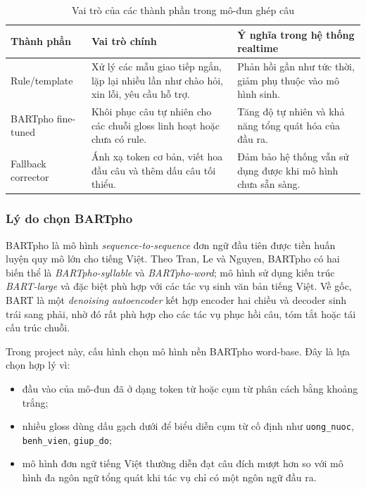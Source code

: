 \begin{table}[H]
\centering
\caption{Vai trò của các thành phần trong mô-đun ghép câu}
\begin{tabularx}{\textwidth}{|p{3.2cm}|X|X|}
\hline
\textbf{Thành phần} & \textbf{Vai trò chính} & \textbf{Ý nghĩa trong hệ thống realtime} \\
\hline
Rule/template & Xử lý các mẫu giao tiếp ngắn, lặp lại nhiều lần như chào hỏi, xin lỗi, yêu cầu hỗ trợ. & Phản hồi gần như tức thời, giảm phụ thuộc vào mô hình sinh. \\
\hline
BARTpho fine-tuned & Khôi phục câu tự nhiên cho các chuỗi gloss linh hoạt hoặc chưa có rule. & Tăng độ tự nhiên và khả năng tổng quát hóa của đầu ra. \\
\hline
Fallback corrector & Ánh xạ token cơ bản, viết hoa đầu câu và thêm dấu câu tối thiểu. & Đảm bảo hệ thống vẫn sử dụng được khi mô hình chưa sẵn sàng. \\
\hline
\end{tabularx}
\end{table}

\subsubsection{Lý do chọn BARTpho}

BARTpho là mô hình \textit{sequence-to-sequence} đơn ngữ đầu tiên được tiền huấn luyện
quy mô lớn cho tiếng Việt. Theo Tran, Le và Nguyen, BARTpho có hai biến thể là
\textit{BARTpho-syllable} và \textit{BARTpho-word}; mô hình sử dụng kiến trúc
\textit{BART-large} và đặc biệt phù hợp với các tác vụ sinh văn bản tiếng Việt. Về gốc,
BART là một \textit{denoising autoencoder} kết hợp encoder hai chiều và decoder sinh
trái sang phải, nhờ đó rất phù hợp cho các tác vụ phục hồi câu, tóm tắt hoặc tái cấu trúc
chuỗi.

Trong project này, cấu hình  chọn mô hình nền BARTpho word-base. Đây là lựa chọn hợp lý vì:
\begin{itemize}
    \item đầu vào của mô-đun đã ở dạng token từ hoặc cụm từ phân cách bằng khoảng
    trắng;
    \item nhiều gloss dùng dấu gạch dưới để biểu diễn cụm từ cố định như
    \texttt{uong\_nuoc}, \texttt{benh\_vien}, \texttt{giup\_do};
    \item mô hình đơn ngữ tiếng Việt thường diễn đạt câu đích mượt hơn so với mô hình đa
    ngôn ngữ tổng quát khi tác vụ chỉ có một ngôn ngữ đầu ra.
\end{itemize}

